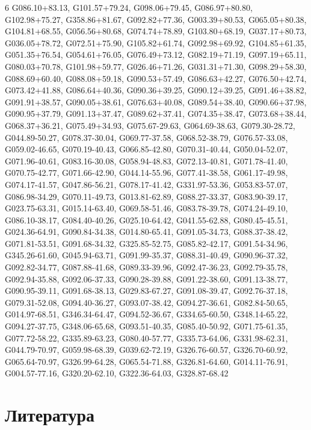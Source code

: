 \documentclass[12pt,a4paper]{article}
\newcommand{\numofcol}{6}
\begin{document}
\begin{multicols}{\numofcol}
G086.10+83.13, G101.57+79.24, G098.06+79.45, G086.97+80.80, G102.98+75.27, G358.86+81.67, G092.82+77.36, G003.39+80.53, G065.05+80.38, G104.81+68.55, G056.56+80.68, G074.74+78.89, G103.80+68.19, G037.17+80.73, G036.05+78.72, G072.51+75.90, G105.82+61.74, G092.98+69.92, G104.85+61.35, G051.35+76.54, G054.61+76.05, G076.49+73.12, G082.19+71.19, G097.19+65.11, G080.03+70.78, G101.98+59.77, G026.46+71.26, G031.31+71.30, G098.29+58.30, G088.69+60.40, G088.08+59.18, G090.53+57.49, G086.63+42.27, G076.50+42.74, G073.42+41.88, G086.64+40.36, G090.36+39.25, G090.12+39.25, G091.46+38.82, G091.91+38.57, G090.05+38.61, G076.63+40.08, G089.54+38.40, G090.66+37.98, G090.95+37.79, G091.13+37.47, G089.62+37.41, G074.35+38.47, G073.68+38.44, G068.37+36.21, G075.49+34.93, G075.67-29.63, G064.69-38.63, G079.30-28.72, G044.89-50.27, G078.37-30.04, G069.77-37.58, G068.52-38.79, G076.57-33.08, G059.02-46.65, G070.19-40.43, G066.85-42.80, G070.31-40.44, G050.04-52.07, G071.96-40.61, G083.16-30.08, G058.94-48.83, G072.13-40.81, G071.78-41.40, G070.75-42.77, G071.66-42.90, G044.14-55.96, G077.41-38.58, G061.17-49.98, G074.17-41.57, G047.86-56.21, G078.17-41.42, G331.97-53.36, G053.83-57.07, G086.98-34.29, G070.11-49.73, G013.81-62.89, G088.27-33.37, G083.90-39.17, G023.75-63.31, G015.14-63.40, G069.58-51.46, G083.78-39.78, G074.24-49.10, G086.10-38.17, G084.40-40.26, G025.10-64.42, G041.55-62.88, G080.45-45.51, G024.36-64.91, G090.84-34.38, G014.80-65.41, G091.05-34.73, G088.37-38.42, G071.81-53.51, G091.68-34.32, G325.85-52.75, G085.82-42.17, G091.54-34.96, G345.26-61.60, G045.94-63.71, G091.99-35.37, G088.31-40.49, G090.96-37.32, G092.82-34.77, G087.88-41.68, G089.33-39.96, G092.47-36.23, G092.79-35.78, G092.94-35.88, G092.06-37.33, G090.28-39.88, G091.22-38.60, G091.13-38.77, G090.95-39.11, G091.68-38.13, G029.83-67.27, G091.08-39.47, G092.76-37.18, G079.31-52.08, G094.40-36.27, G093.07-38.42, G094.27-36.61, G082.84-50.65, G014.97-68.51, G346.34-64.47, G094.52-36.67, G334.65-60.50, G348.14-65.22, G094.27-37.75, G348.06-65.68, G093.51-40.35, G085.40-50.92, G071.75-61.35, G077.72-58.22, G335.89-63.23, G080.40-57.77, G335.73-64.06, G331.98-62.31, G044.79-70.97, G059.98-68.39, G039.62-72.19, G326.76-60.57, G326.70-60.92, G065.64-70.97, G326.99-64.28, G065.54-71.88, G326.81-64.60, G014.11-76.91, G004.57-77.16, G320.20-62.10, G322.36-64.03, G328.87-68.42
\end{multicols}

\newpage
\section{Литература}
\end{document}
